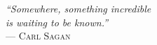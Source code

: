 {\sffamily\itshape
``Somewhere, something incredible \\ is waiting to be known.''\\} %
--- \textsc{Carl Sagan}
